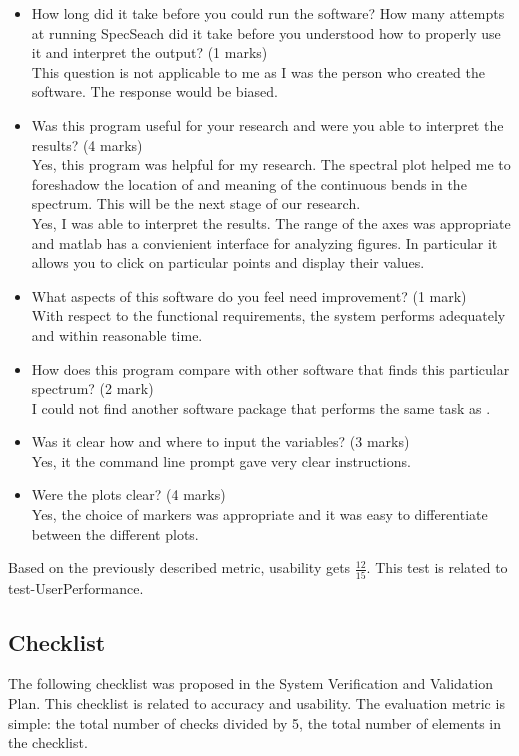 \documentclass[12pt, titlepage]{article}
\begin{document}
\label{UsabilitySurvey}
\begin{itemize}
	\item How long did it take before you could run the software? How many 
	attempts at running SpecSeach did it take before you understood how to 
	properly use it and interpret the output? (1 marks) \\
	This question is not applicable to me as I was the person who created the 
	software. The response would be biased. 
	\item Was this program useful for your research and were you able to 
	interpret the results? (4 marks) \\ 
	Yes, this program was helpful for my research. The spectral plot helped me 
	to foreshadow the location of and meaning of the continuous bends in the 
	spectrum. This will be the next stage of our research.\\
	Yes, I was able to interpret the results. The range of the axes was 
	appropriate and matlab has a convienient interface for analyzing figures. 
	In particular it allows you to click on particular points and display their 
	values. 
	\item What aspects of this software do you feel need improvement? (1 
	mark)\\ 
	With respect to the functional requirements, the system performs adequately 
	and within reasonable time.
	\item How does this program compare with other software that finds this 
	particular spectrum? (2 mark)\\ 
	I could not find another software package that performs the same task as 
	\progname. 
	\item Was it clear how and where to input the variables? (3 marks) \\
	Yes, it the command line prompt gave very clear instructions. 
	\item Were the plots clear? (4 marks) \\
	Yes, the choice of markers was appropriate and it was easy to differentiate 
	between the different plots.
\end{itemize} 
\noindent
Based on the previously described metric, usability gets $\frac{12}{15}$. This 
test is related to test-UserPerformance.
		
\subsection{Checklist}

The following checklist was proposed in the System Verification and 
Validation Plan. This checklist is related to accuracy and usability. The 
evaluation metric is simple: the total number of checks divided by 5, the total 
number of elements in the checklist. 
\end{document}
